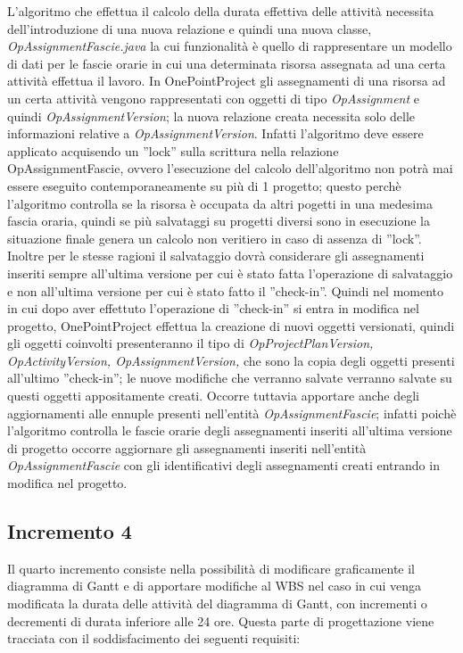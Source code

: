 L\textquoteright{}algoritmo che effettua il calcolo della durata effettiva delle attivit\`{a} necessita dell\textquoteright{}introduzione di una nuova relazione e quindi una nuova classe, \textit{OpAssignmentFascie.java} la cui funzionalit\`{a} \`{e} quello di rappresentare un modello di dati per le fascie orarie in cui una determinata risorsa assegnata ad una certa attivit\`{a} effettua il lavoro. In OnePointProject gli assegnamenti di una risorsa ad un certa attivit\`{a} vengono rappresentati con oggetti di tipo \textit{OpAssignment} e quindi \textit{OpAssignmentVersion}; la nuova relazione creata necessita solo delle informazioni relative a \textit{OpAssignmentVersion}. Infatti l\textquoteright{}algoritmo deve essere applicato acquisendo un ''lock'' sulla scrittura nella relazione OpAssignmentFascie, ovvero l\textquoteright{}esecuzione del calcolo dell\textquoteright{}algoritmo non potr\`{a} mai essere eseguito contemporaneamente su pi\`{u} di 1 progetto; questo perch\`{e} l\textquoteright{}algoritmo controlla se la risorsa \`{e} occupata da altri pogetti in una medesima fascia oraria, quindi se pi\`{u} salvataggi su progetti diversi sono in esecuzione la situazione finale genera un calcolo non veritiero in caso di assenza di ''lock''. Inoltre per le stesse ragioni il salvataggio dovr\`{a} considerare gli assegnamenti inseriti sempre all\textquoteright{}ultima versione per cui \`{e} stato fatta l\textquoteright{}operazione di salvataggio e non all\textquoteright{}ultima versione per cui \`{e} stato fatto il ''check-in''. Quindi nel momento in cui dopo aver effettuto l\textquoteright{}operazione di ''check-in'' si entra in modifica nel progetto, OnePointProject effettua la creazione di nuovi oggetti versionati, quindi gli oggetti coinvolti presenteranno il tipo di \textit{OpProjectPlanVersion, OpActivityVersion, OpAssignmentVersion,} che sono la copia degli oggetti presenti all\textquoteright{}ultimo ''check-in''; le nuove modifiche che verranno salvate verranno salvate su questi oggetti appositamente creati. Occorre tuttavia apportare anche degli aggiornamenti alle ennuple presenti nell\textquoteright{}entit\`{a} \textit{OpAssignmentFascie}; infatti poich\`{e} l\textquoteright{}algoritmo controlla le fascie orarie degli assegnamenti inseriti all\textquoteright{}ultima versione di progetto occorre aggiornare gli assegnamenti inseriti nell\textquoteright{}entit\`{a} \textit{OpAssignmentFascie} con gli identificativi degli assegnamenti creati entrando in modifica nel progetto. 


\subsection{Incremento 4}
Il quarto incremento consiste nella possibilit\`{a} di modificare graficamente il diagramma di Gantt e di apportare modifiche al WBS nel caso in cui venga modificata la durata delle attivit\`{a} del diagramma di Gantt, con incrementi o decrementi di durata inferiore alle 24 ore. Questa parte di progettazione viene tracciata con il soddisfacimento dei seguenti requisiti:

